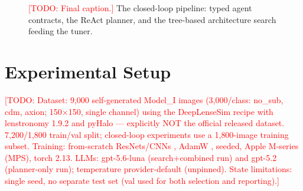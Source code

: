 \documentclass{article}
\newcommand{\todo}[1]{\textcolor{red}{[TODO: #1]}}
\begin{document}
\begin{figure}[t]
  \centering
  \caption{\todo{Final caption.} The closed-loop pipeline: typed agent contracts,
  the ReAct planner, and the tree-based architecture search feeding the tuner.}
  \label{fig:pipeline}
\end{figure}

\section{Experimental Setup}
\label{sec:setup}
\todo{Dataset: 9{,}000 self-generated Model\_I images (3{,}000/class: no\_sub, cdm,
axion; 150$\times$150, single channel) using the DeepLenseSim recipe with
lenstronomy 1.9.2 \citep{birrer2018lenstronomy} and pyHalo \citep{gilman2020pyhalo}
— explicitly NOT the official released dataset. 7{,}200/1{,}800 train/val split;
closed-loop experiments use a 1{,}800-image training subset. Training: from-scratch
ResNets/CNNs \citep{he2016deep}, AdamW \citep{loshchilov2019adamw}, seeded, Apple
M-series (MPS), torch 2.13. LLMs: gpt-5.6-luna (search+combined run) and gpt-5.2
(planner-only run); temperature provider-default (unpinned). State limitations:
single seed, no separate test set (val used for both selection and reporting).}
\end{document}
